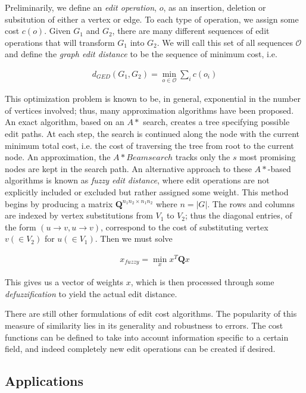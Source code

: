 \documentclass[11pt]{article}
\begin{document}
Preliminarily, we define an \textit{edit operation}, $o$, as an insertion, deletion or subsitution of either a vertex or edge. To each type of operation, we assign some cost $c(o)$. Given $G_1$ and $G_2$, there are many different sequences of edit operations that will transform $G_1$ into $G_2$. We will call this set of all sequences $\mathcal{O}$ and define the \textit{graph edit distance} to be the sequence of minimum cost, i.e.

\begin{align}
d_{GED}(G_1, G_2) = \min\limits_{o \in \mathcal{O}} \sum\limits_{i} c(o_i)
\label{eqn:ged}
\end{align}
 
This optimization problem is known to be, in general, exponential in the number of vertices involved; thus, many approximation algorithms have been proposed. An exact algorithm, based on an $A*$ search, creates a tree specifying possible edit paths. At each step, the search is continued along the node with the current minimum total cost, i.e. the cost of traversing the tree from root to the current node. An approximation, the $A* Beamsearch$ tracks only the $s$ most promising nodes are kept in the search path. An alternative approach to these $A*$-based algorithms is known as \textit{fuzzy edit distance}, where edit operations are not explicitly included or excluded but rather assigned some weight. This method begins by producing a matrix $\textbf{Q}^{n_1n_2 \times n_1n_2}$ where $n = |G|$. The rows and columns are indexed by vertex substitutions from $V_1$ to $V_2$; thus the diagonal entries, of the form $(u \rightarrow v, u \rightarrow v)$, correspond to the cost of substituting vertex $v (\in V_2)$ for $u (\in V_1)$. Then we must solve

\begin{align}
x_{fuzzy} = \min\limits_{x} x^T\textbf{Q}x
\label{eqn:fuzzy}
\end{align}

This gives us a vector of weights $x$, which is then processed through some \textit{defuzzification} to yield the actual edit distance. 

There are still other formulations of edit cost algorithms. The popularity of this measure of similarity lies in its generality and robustness to errors. The cost functions can be defined to take into account information specific to a certain field, and indeed completely new edit operations can be created if desired.

\subsection{Applications}
\end{document}

